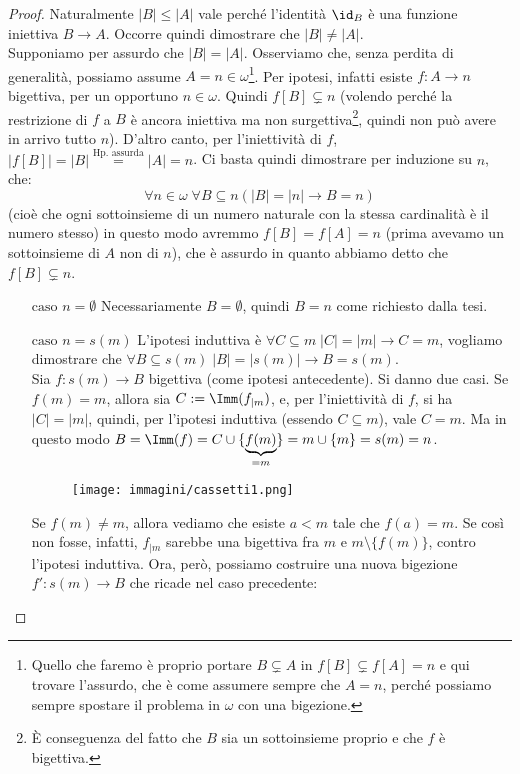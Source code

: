 \documentclass[11pt]{scrartcl}
\begin{document}
\begin{proof}
	Naturalmente $|B| \leq |A|$ vale perché l'identità $\id_B$ è una funzione iniettiva $B \rightarrow A$. Occorre quindi dimostrare che $|B| \ne |A|$.\\
	Supponiamo per assurdo che $|B| = |A|$. Osserviamo che, senza perdita di generalità, possiamo assume $A = n \in \omega$\footnote{Quello che faremo è proprio portare $B \subsetneq A$ in $f[B] \subsetneq f[A] = n$ e qui trovare l'assurdo, che è come assumere sempre che 
	$A = n$, perché possiamo sempre spostare il problema in $\omega$ con una bigezione.}. Per ipotesi, infatti esiste $f : A \rightarrow n$ bigettiva, per un opportuno $n \in \omega$.
	Quindi $f[B] \subsetneq n$ (volendo perché la restrizione di $f$ a $B$ è ancora iniettiva ma non surgettiva\footnote{È conseguenza del fatto che $B$ sia un sottoinsieme proprio e che $f$ è bigettiva.}, quindi non può
	avere in arrivo tutto $n$). D'altro canto, per l'iniettività di $f$, $|f[B]| = |B| \overset{\text{Hp. assurda}}{=} |A| = n$.
	Ci basta quindi dimostrare per induzione su $n$, che:
	\[ \forall n \in \omega \; \forall B \subseteq n (|B|=|n|\longrightarrow B = n)
		\]
	(cioè che ogni sottoinsieme di un numero naturale con la stessa cardinalità è il numero stesso) in questo modo avremmo $f[B] = f[A] = n$ (prima avevamo un sottoinsieme di $A$ non di $n$), che è assurdo in quanto abbiamo detto che $f[B] \subsetneq n$.
	\begin{itemize}
		\item[$\boxed{\text{caso $n = \emptyset$}}$] Necessariamente $B = \emptyset$, quindi $B = n$ come richiesto dalla tesi.
		\item[$\boxed{\text{caso $n = s(m)$}}$] L'ipotesi induttiva è $\forall C \subseteq m \; |C| = |m| \rightarrow C = m$, vogliamo dimostrare che $\forall B \subseteq s(m) \; |B| = |s(m)| \rightarrow B = s(m)$.\\
		Sia $f : s(m) \rightarrow B$ bigettiva (come ipotesi antecedente). Si danno due casi. Se $f(m) = m$, allora sia $C := \Imm(f_{|m})$, e, per l'iniettività di $f$, si ha $|C| = |m|$, quindi, per l'ipotesi induttiva (essendo $C \subseteq m$), vale $C = m$. Ma in questo modo $B = \Imm(f) = C \cup \{\underbrace{f(m)}_{= m}\} = m \cup \{m\} = s(m) = n$.
		\begin{figure}[H]
			\centering
			\texttt{[image: immagini/cassetti1.png]}
		\end{figure}
		Se $f(m) \ne m$, allora vediamo che esiste $a < m$ tale che $f(a) = m$. Se così non fosse, infatti, $f_{|m}$ sarebbe una bigettiva fra $m$ e $m \setminus \{f(m)\}$, contro l'ipotesi induttiva. Ora, però, possiamo costruire una nuova bigezione $f' : s(m) \rightarrow B$ che ricade nel caso precedente:

\end{itemize}
\end{proof}
\end{document}

